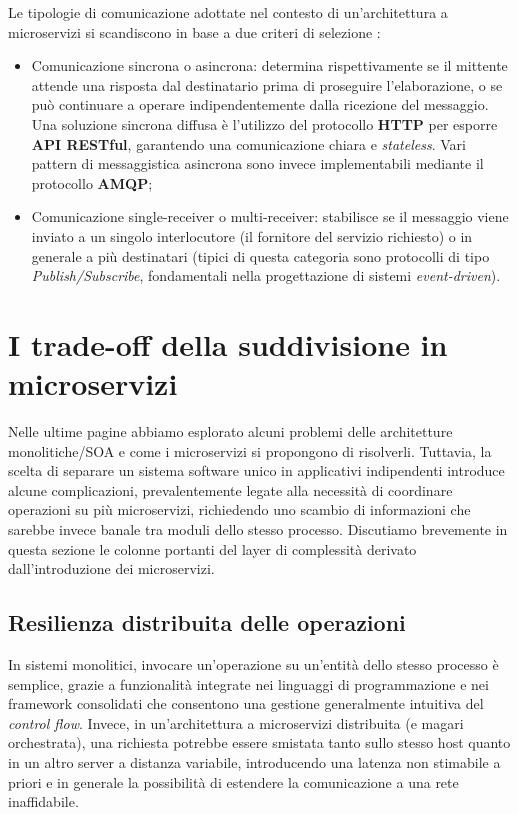Le tipologie di comunicazione adottate nel contesto di un'architettura a microservizi si scandiscono in base a due criteri di selezione \cite[p.19]{Thesis_microservices}:
\begin{itemize}
  \item Comunicazione sincrona o asincrona: determina rispettivamente se il mittente attende una risposta dal destinatario prima di proseguire l'elaborazione, o se può continuare a operare indipendentemente dalla ricezione del messaggio. Una soluzione sincrona diffusa è l'utilizzo del protocollo \textbf{HTTP} per esporre \textbf{API RESTful}, garantendo una comunicazione chiara e \emph{stateless}. Vari pattern di messaggistica asincrona sono invece implementabili mediante il protocollo \textbf{AMQP};
  \item Comunicazione single-receiver o multi-receiver: stabilisce se il messaggio viene inviato a un singolo interlocutore (il fornitore del servizio richiesto) o in generale a più destinatari (tipici di questa categoria sono protocolli di tipo \emph{Publish/Subscribe}, fondamentali nella progettazione di sistemi \emph{event-driven}).
\end{itemize}

\section{I trade-off della suddivisione in microservizi}
Nelle ultime pagine abbiamo esplorato alcuni problemi delle architetture monolitiche/SOA e come i microservizi si propongono di risolverli. Tuttavia, la scelta di separare un sistema software unico in applicativi indipendenti introduce alcune complicazioni, prevalentemente legate alla necessità di coordinare operazioni su più microservizi, richiedendo uno scambio di informazioni che sarebbe invece banale tra moduli dello stesso processo.
Discutiamo brevemente in questa sezione le colonne portanti del layer di complessità derivato dall'introduzione dei microservizi.

\subsection{Resilienza distribuita delle operazioni}
In sistemi monolitici, invocare un'operazione su un'entità dello stesso processo è semplice, grazie a funzionalità integrate nei linguaggi di programmazione e nei framework consolidati che consentono una gestione generalmente intuitiva del \emph{control flow}.
Invece, in un'architettura a microservizi distribuita (e magari orchestrata), una richiesta potrebbe essere smistata tanto sullo stesso host quanto in un altro server a distanza variabile, introducendo una latenza non stimabile a priori e in generale la possibilità di estendere la comunicazione a una rete inaffidabile.

